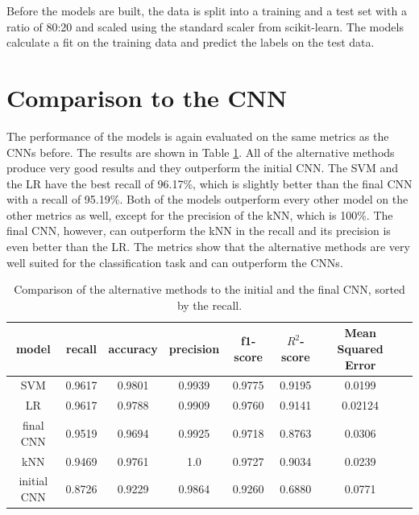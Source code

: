 Before the models are built, the data is split into a training and a test set with a ratio of 80:20 and scaled using the standard scaler from scikit-learn.
The models calculate a fit on the training data and predict the labels on the test data.

\section{Comparison to the CNN}
\label{sec:comparison}

The performance of the models is again evaluated on the same metrics as the CNNs before.
The results are shown in Table \ref{tab:comparisonTable}.
All of the alternative methods produce very good results and they outperform the initial CNN.
The SVM and the LR have the best recall of 96.17\%, which is slightly better than the final CNN with a recall of 95.19\%.
Both of the models outperform every other model on the other metrics as well, except for the precision of the kNN, which is 100\%.
The final CNN, however, can outperform the kNN in the recall and its precision is even better than the LR.
The metrics show that the alternative methods are very well suited for the classification task and can outperform the CNNs.
\begin{table}[H]
    \centering
    \caption{Comparison of the alternative methods to the initial and the final CNN, sorted by the recall.}
    \label{tab:comparisonTable}
    \begin{tabular}{c | c c c c c c c}
        \toprule
        model & recall & accuracy & precision & f1-score & $R^2$-score & Mean Squared Error \\ 
        \midrule
        SVM & 0.9617 & 0.9801 & 0.9939 & 0.9775 & 0.9195 & 0.0199 \\
        LR & 0.9617 & 0.9788 & 0.9909 & 0.9760 & 0.9141 & 0.02124 \\
        final CNN & 0.9519 & 0.9694 & 0.9925 & 0.9718 & 0.8763 & 0.0306 \\ 
        kNN & 0.9469 & 0.9761 & 1.0 & 0.9727 & 0.9034 & 0.0239 \\
        initial CNN & 0.8726 & 0.9229 & 0.9864 & 0.9260 & 0.6880 & 0.0771 \\
        \bottomrule
    \end{tabular}
\end{table}


